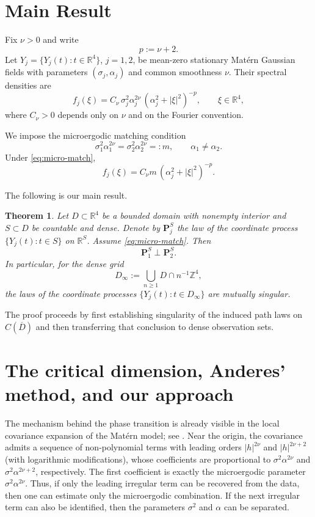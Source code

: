 \documentclass[11pt, reqno]{amsart}
\newtheorem{theorem}{Theorem}
\theoremstyle{remark}
\newcommand{\R}{\mathbb{R}}
\newcommand{\Z}{\mathbb{Z}}
\newcommand{\1}{\mathbf{1}}
\newcommand{\abs}[1]{\left\lvert #1 \right\rvert}
\begin{document}
\section{Main Result}
Fix $\nu>0$ and write
\[
p:=\nu+2.
\]
Let $Y_j=\{Y_j(t):t\in\R^4\}$, $j=1,2$, be mean-zero stationary Mat\'ern Gaussian fields with parameters
$(\sigma_j,\alpha_j)$ and common smoothness $\nu$. Their spectral densities are
\begin{equation}\label{eq:matern-spectral}
f_j(\xi)=C_\nu\,\sigma_j^2\alpha_j^{2\nu}\,(\alpha_j^2+\abs{\xi}^2)^{-p},
\qquad \xi\in\R^4,
\end{equation}
where $C_\nu>0$ depends only on $\nu$ and on the Fourier convention.

We impose the microergodic matching condition
\begin{equation}\label{eq:micro-match}
\sigma_1^2\alpha_1^{2\nu}=\sigma_2^2\alpha_2^{2\nu}=:m,
\qquad
\alpha_1\neq \alpha_2.
\end{equation}
Under \eqref{eq:micro-match},
\[
f_j(\xi)=C_\nu m\,(\alpha_j^2+\abs{\xi}^2)^{-p}.
\]

The following is our main result.

\begin{theorem}\label{thm:main}
Let $D \subset \R^4$ be a bounded domain with nonempty interior and $S \subset D$ be countable and dense. Denote by $\mathbf{P}_j^S$ the law of the coordinate process
$\{Y_j(t):t\in S\}$ on $\R^S$. 
Assume \eqref{eq:micro-match}. Then
\[
\mathbf{P}_1^S\perp \mathbf{P}_2^S.
\]
In particular, for the dense grid
\[
D_\infty:=\bigcup_{n\ge1} D\cap n^{-1}\Z^4,
\]
the laws of the coordinate processes \(\{Y_j(t):t\in D_\infty\}\) are mutually singular.
\end{theorem}

The proof proceeds by first establishing singularity of the induced path laws on
\(C(\overline D)\) and then transferring that conclusion to dense observation sets.

\section{The critical dimension, Anderes' method, and our approach} \label{sec:comparison}

The mechanism behind the phase transition is already visible in the local
covariance expansion of the Mat\'ern model; see \citet{Anderes2010}.
Near the origin, the covariance admits a sequence of non-polynomial terms with leading orders $|h|^{2\nu}$ and $|h|^{2\nu+2}$ (with logarithmic modifications), whose coefficients are proportional to $\sigma^2 \alpha^{2\nu}$ and $\sigma^2 \alpha^{2\nu+2}$, respectively.
The first coefficient is exactly the microergodic parameter
\(\sigma^2\alpha^{2\nu}\).
Thus, if only the leading irregular term can be recovered from the data,
then one can estimate only the microergodic combination.
If the next irregular term can also be identified, then the parameters
\(\sigma^2\) and \(\alpha\) can be separated.
\end{document}
